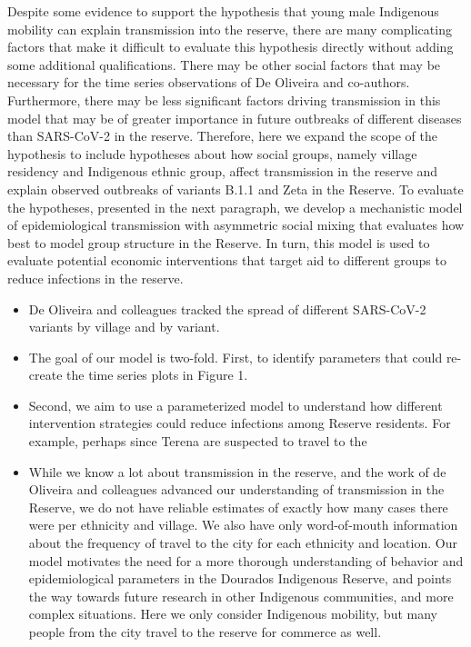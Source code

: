 \documentclass[
  letterpaper,
  abstract]{scrartcl}
\begin{document}
Despite some evidence to support the hypothesis that young male
Indigenous mobility can explain transmission into the reserve, there are
many complicating factors that make it difficult to evaluate this
hypothesis directly without adding some additional qualifications. There
may be other social factors that may be necessary for the time series
observations of De Oliveira and co-authors. Furthermore, there may be
less significant factors driving transmission in this model that may be
of greater importance in future outbreaks of different diseases than
SARS-CoV-2 in the reserve. Therefore, here we expand the scope of the
hypothesis to include hypotheses about how social groups, namely village
residency and Indigenous ethnic group, affect transmission in the
reserve and explain observed outbreaks of variants B.1.1 and Zeta in the
Reserve. To evaluate the hypotheses, presented in the next paragraph, we
develop a mechanistic model of epidemiological transmission with
asymmetric social mixing that evaluates how best to model group
structure in the Reserve. In turn, this model is used to evaluate
potential economic interventions that target aid to different groups to
reduce infections in the reserve.

\begin{itemize}
\item
  De Oliveira and colleagues tracked the spread of different SARS-CoV-2
  variants by village and by variant.
\item
  The goal of our model is two-fold. First, to identify parameters that
  could re-create the time series plots in Figure 1.
\item
  Second, we aim to use a parameterized model to understand how
  different intervention strategies could reduce infections among
  Reserve residents. For example, perhaps since Terena are suspected to
  travel to the
\item
  While we know a lot about transmission in the reserve, and the work of
  de Oliveira and colleagues advanced our understanding of transmission
  in the Reserve, we do not have reliable estimates of exactly how many
  cases there were per ethnicity and village. We also have only
  word-of-mouth information about the frequency of travel to the city
  for each ethnicity and location. Our model motivates the need for a
  more thorough understanding of behavior and epidemiological parameters
  in the Dourados Indigenous Reserve, and points the way towards future
  research in other Indigenous communities, and more complex situations.
  Here we only consider Indigenous mobility, but many people from the
  city travel to the reserve for commerce as well.
\end{itemize}
\end{document}
